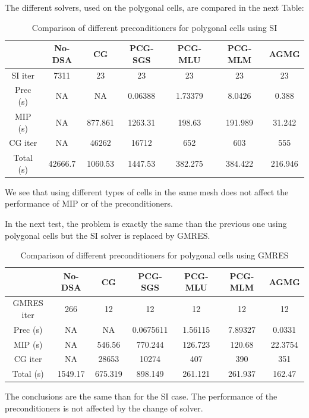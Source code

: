 The different solvers, used on the polygonal cells, are compared in the next Table:
\begin{table}[H]
\begin{center}
\caption{Comparison of different preconditioners for polygonal cells using SI}
\begin{tabular}{|c|c|c|c|c|c|c|}
\hline
& No-DSA & CG & PCG-SGS & PCG-MLU & PCG-MLM & AGMG\\
\hline
SI iter   & 7311    & 23      & 23      & 23      & 23      & 23      \\
Prec (s)  & NA      & NA      & 0.06388 & 1.73379 & 8.0426  & 0.388   \\
MIP (s)   & NA      & 877.861 & 1263.31 & 198.63  & 191.989 & 31.242  \\
CG iter   & NA      & 46262   & 16712   & 652     & 603     & 555     \\
Total (s) & 42666.7 & 1060.53 & 1447.53 & 382.275 & 384.422 & 216.946 \\
\hline
\end{tabular}
\end{center}
\end{table}
We see that using different types of cells in the same mesh does not affect
the performance of MIP or of the preconditioners. 

In the next test, the problem is exactly the same than the previous one using
polygonal cells but the SI solver is replaced by GMRES.
\begin{table}[H]
\begin{center}
\caption{Comparison of different preconditioners for polygonal cells using
GMRES}
\begin{tabular}{|c|c|c|c|c|c|c|}
\hline
& No-DSA & CG & PCG-SGS & PCG-MLU & PCG-MLM & AGMG\\
\hline
GMRES iter & 266     & 12      & 12        & 12      & 12      & 12 \\
Prec (s)   & NA      & NA      & 0.0675611 & 1.56115 & 7.89327 & 0.0331 \\
MIP (s)    & NA      & 546.56  & 770.244   & 126.723 & 120.68  & 22.3754 \\
CG iter    & NA      & 28653   & 10274     & 407     & 390     & 351 \\
Total (s)  & 1549.17 & 675.319 & 898.149   & 261.121 & 261.937 & 162.47 \\
\hline
\end{tabular}
\end{center}
\end{table}
The conclusions are the same than for the SI case. The performance of the
preconditioners is not affected by the change of solver.

